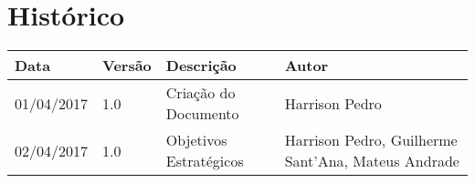 \chapter{Histórico}

\begin{tabular}{ |p{3cm}|p{3cm}|p{3cm}|p{3cm}|  }
 \hline
 Data 		& 		Versão & 		Descrição 			& 		Autor\\
 \hline\hline
 01/04/2017 & 		1.0    &		Criação do Documento &   	Harrison Pedro \\ 
 \hline
 02/04/2017 & 		1.0    &		Objetivos Estratégicos &   	Harrison Pedro, Guilherme Sant'Ana, Mateus Andrade \\ 
 \hline

\end{tabular}

